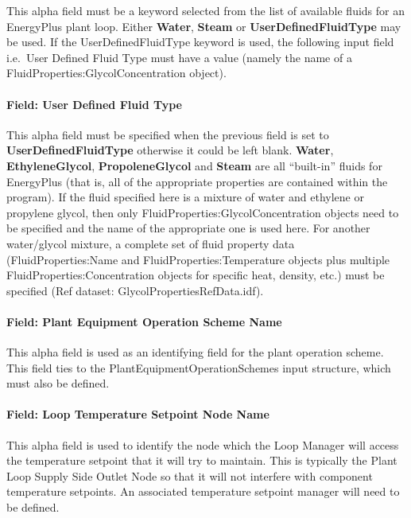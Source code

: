 This alpha field must be a keyword selected from the list of available fluids for an EnergyPlus plant loop. Either \textbf{Water}, \textbf{Steam} or \textbf{UserDefinedFluidType} may be used. If the UserDefinedFluidType keyword is used, the following input field i.e.~User Defined Fluid Type must have a value (namely the name of a FluidProperties:GlycolConcentration object).

\paragraph{Field: User Defined Fluid Type}\label{field-user-defined-fluid-type-000}

This alpha field must be specified when the previous field is set to \textbf{UserDefinedFluidType} otherwise it could be left blank. \textbf{Water}, \textbf{EthyleneGlycol}, \textbf{PropoleneGlycol} and \textbf{Steam} are all ``built-in'' fluids for EnergyPlus (that is, all of the appropriate properties are contained within the program). If the fluid specified here is a mixture of water and ethylene or propylene glycol, then only FluidProperties:GlycolConcentration objects need to be specified and the name of the appropriate one is used here. For another water/glycol mixture, a complete set of fluid property data (FluidProperties:Name and FluidProperties:Temperature objects plus multiple FluidProperties:Concentration objects for specific heat, density, etc.) must be specified (Ref dataset: GlycolPropertiesRefData.idf).

\paragraph{Field: Plant Equipment Operation Scheme Name}\label{field-plant-equipment-operation-scheme-name}

This alpha field is used as an identifying field for the plant operation scheme. This field ties to the PlantEquipmentOperationSchemes input structure, which must also be defined.

\paragraph{Field: Loop Temperature Setpoint Node Name}\label{field-loop-temperature-setpoint-node-name}

This alpha field is used to identify the node which the Loop Manager will access the temperature setpoint that it will try to maintain. This is typically the Plant Loop Supply Side Outlet Node so that it will not interfere with component temperature setpoints. An associated temperature setpoint manager will need to be defined.

